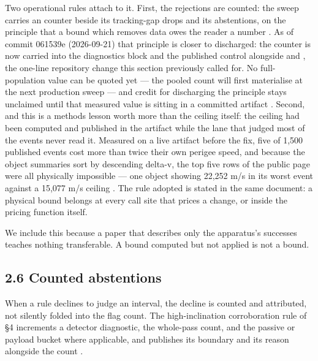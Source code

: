 \documentclass[11pt]{article}
\begin{document}
Two operational rules attach to it. First, the rejections are counted: the sweep carries an  counter beside its tracking-gap drops and its abstentions, on the principle that a bound which removes data owes the reader a number%
. As of commit 061539e (2026-09-21) that principle is closer to discharged: the counter is now carried into the diagnostics block and the published control alongside  and , the one-line repository change this section previously called for. No full-population value can be quoted yet --- the pooled count will first materialise at the next production sweep --- and credit for discharging the principle stays unclaimed until that measured value is sitting in a committed artifact%
. Second, and this is a methods lesson worth more than the ceiling itself: the ceiling had been computed and published in the artifact while the lane that judged most of the events never read it. Measured on a live artifact before the fix, five of 1,500 published events cost more than twice their own perigee speed, and because the object summaries sort by descending delta-v, the top five rows of the public page were all physically impossible --- one object showing 22,252 m/s in its worst event against a 15,077 m/s ceiling%
. The rule adopted is stated in the same document: a physical bound belongs at every call site that prices a change, or inside the pricing function itself.

We include this because a paper that describes only the apparatus's successes teaches nothing transferable. A bound computed but not applied is not a bound.

\subsection*{2.6 Counted abstentions}

When a rule declines to judge an interval, the decline is counted and attributed, not silently folded into the flag count. The high-inclination corroboration rule of \S{}4 increments a detector diagnostic, the whole-pass count, and the passive or payload bucket where applicable, and publishes its boundary and its reason alongside the count%
.
\end{document}
